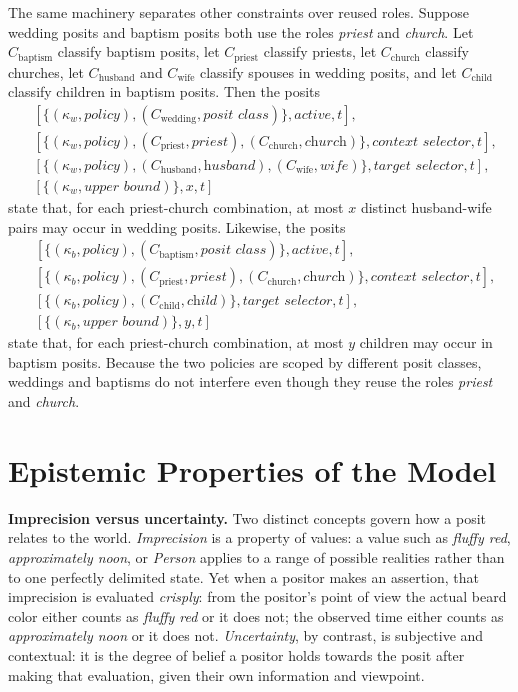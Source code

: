 \documentclass[a4paper,fleqn]{cas-sc}
\begin{document}
The same machinery separates other constraints over reused roles. Suppose wedding posits and baptism posits both use the roles \textit{priest} and \textit{church}. Let \(C_{\mathrm{baptism}}\) classify baptism posits, let \(C_{\mathrm{priest}}\) classify priests, let \(C_{\mathrm{church}}\) classify churches, let \(C_{\mathrm{husband}}\) and \(C_{\mathrm{wife}}\) classify spouses in wedding posits, and let \(C_{\mathrm{child}}\) classify children in baptism posits. Then the posits
\[
\begin{aligned}
&[\{(\kappa_w, \textit{policy}), (C_{\mathrm{wedding}}, \textit{posit class})\}, \textit{active}, t], \\
&[\{(\kappa_w, \textit{policy}), (C_{\mathrm{priest}}, \textit{priest}), (C_{\mathrm{church}}, \textit{church})\}, \textit{context selector}, t], \\
&[\{(\kappa_w, \textit{policy}), (C_{\mathrm{husband}}, \textit{husband}), (C_{\mathrm{wife}}, \textit{wife})\}, \textit{target selector}, t], \\
&[\{(\kappa_w, \textit{upper bound})\}, x, t]
\end{aligned}
\]
state that, for each priest-church combination, at most \(x\) distinct husband-wife pairs may occur in wedding posits. Likewise, the posits
\[
\begin{aligned}
&[\{(\kappa_b, \textit{policy}), (C_{\mathrm{baptism}}, \textit{posit class})\}, \textit{active}, t], \\
&[\{(\kappa_b, \textit{policy}), (C_{\mathrm{priest}}, \textit{priest}), (C_{\mathrm{church}}, \textit{church})\}, \textit{context selector}, t], \\
&[\{(\kappa_b, \textit{policy}), (C_{\mathrm{child}}, \textit{child})\}, \textit{target selector}, t], \\
&[\{(\kappa_b, \textit{upper bound})\}, y, t]
\end{aligned}
\]
state that, for each priest-church combination, at most \(y\) children may occur in baptism posits. Because the two policies are scoped by different posit classes, weddings and baptisms do not interfere even though they reuse the roles \textit{priest} and \textit{church}.

\section{Epistemic Properties of the Model}
\textbf{Imprecision versus uncertainty.} Two distinct concepts govern how a posit relates to the world. \emph{Imprecision} is a property of values: a value such as \textit{fluffy red}, \textit{approximately noon}, or \textit{Person} applies to a range of possible realities rather than to one perfectly delimited state. Yet when a positor makes an assertion, that imprecision is evaluated \emph{crisply}: from the positor's point of view the actual beard color either counts as \textit{fluffy red} or it does not; the observed time either counts as \textit{approximately noon} or it does not. \emph{Uncertainty}, by contrast, is subjective and contextual: it is the degree of belief a positor holds towards the posit after making that evaluation, given their own information and viewpoint.
\end{document}
